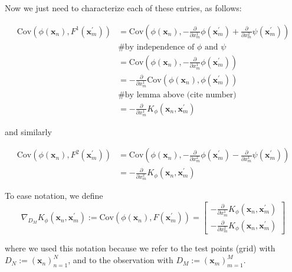 \documentclass[11pt,a4paper]{article}
\newcommand{\icol}[1]{%
  \left(\begin{smallmatrix}#1\end{smallmatrix}\right)%
}
\begin{document}


Now we just need to characterize each of these entries, as follows:

\begin{align*}
    \text{Cov}\left(\phi(\textbf{x}_n), F^1(\textbf{x}_m^\prime)\right) &=    \text{Cov}\left(\phi(\textbf{x}_n), -\frac{\partial}{\partial x_m^{1}} \phi(\textbf{x}_m^\prime) +\frac{\partial}{\partial x_m^2} \psi(\textbf{x}_m^\prime)  \right) \\
    &\text{\# by independence of $\phi$ and $\psi$} \\
   &= \text{Cov}\left(\phi(\textbf{x}_n), -\frac{\partial}{\partial x_m^{1}} \phi(\textbf{x}_m^\prime) \right) \\
   &= 
   -\frac{\partial}{\partial x_m^{1}} \text{Cov}(\phi(\textbf{x}_n), \phi(\textbf{x}_m^\prime)) \\
    &\text{\# by lemma above (cite number)} \\
    &= 
    -\frac{\partial}{\partial x_m^{1}} K_{\phi}(\textbf{x}_n, \textbf{x}_m^\prime)
\end{align*}

and similarly 

\begin{align*}
    \text{Cov}\left(\phi(\textbf{x}_n), F^2(\textbf{x}_m^\prime)\right) &=    \text{Cov}\left(\phi(\textbf{x}_n), -\frac{\partial}{\partial x_m^{2}} \phi(\textbf{x}_m^\prime) - \frac{\partial}{\partial x_m^1} \psi(\textbf{x}_m^\prime)  \right) \\
   &=
    -\frac{\partial}{\partial x_m^{2}} K_{\phi}(\textbf{x}_n, \textbf{x}_m^\prime)
\end{align*}

To ease notation, we define 
$$
\nabla_{D_M}K_{\phi}(\textbf{x}_n, \textbf{x}_m^\prime) := \text{Cov}\left(\phi(\textbf{x}_n), F(\textbf{x}_m^\prime)\right) = 
\begin{bmatrix}
-\frac{\partial}{\partial x_m^{1}} K_{\phi}(\textbf{x}_n, \textbf{x}_m^\prime) \\
-\frac{\partial}{\partial x_m^{2}} K_{\phi}(\textbf{x}_n, \textbf{x}_m^\prime)
\end{bmatrix}
$$

where we used this notation because we refer to the test points (grid) with $D_N := (\textbf{x}_n)_{n=1}^N$, and to the observation with $D_M := (\textbf{x}_m)_{m=1}^M$. \newline
\end{document}
